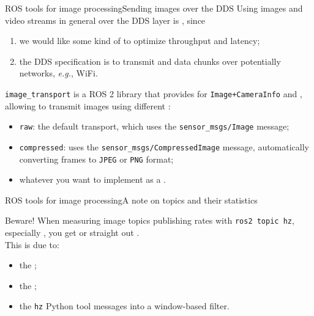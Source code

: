 \begin{frame}{ROS tools for image processing}{Sending images over the DDS}
  \justifying
	Using images and video streams in general over the DDS layer is , since
	\begin{enumerate}
		\item we would like some kind of  to optimize throughput and latency;
		\item the DDS specification is  to transmit  and  data chunks over potentially  networks, \emph{e.g.}, WiFi.
	\end{enumerate}
	\texttt{image\_transport} is a ROS 2 library that provides  for \texttt{Image+CameraInfo}  and , allowing to transmit images using different :
	\begin{itemize}
		\item \texttt{raw}: the default transport, which uses the \texttt{sensor\_msgs/Image} message;
		\item \texttt{compressed}: uses the \texttt{sensor\_msgs/CompressedImage} message, automatically converting frames to \texttt{JPEG} or \texttt{PNG} format;
		\item whatever you want to implement as a .
	\end{itemize}
\end{frame}
\begin{frame}{ROS tools for image processing}{A note on topics and their statistics}
	\begin{alertblock}{Beware!}
    \justifying
    When measuring image topics publishing rates with \texttt{ros2 topic hz}, especially , you  get  or straight out .\\
    This is due to:
    \begin{itemize}
      \item the ;
      \item the ;
      \item the \texttt{hz} Python tool  messages into a window-based filter.
    \end{itemize}
	\end{alertblock}
\end{frame}
